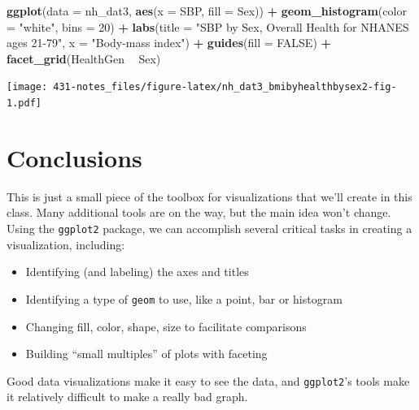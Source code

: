 \documentclass[
]{book}
\newenvironment{Shaded}{\begin{snugshade}}{\end{snugshade}}
\newcommand{\DataTypeTok}[1]{\textcolor[rgb]{0.13,0.29,0.53}{#1}}
\newcommand{\DecValTok}[1]{\textcolor[rgb]{0.00,0.00,0.81}{#1}}
\newcommand{\KeywordTok}[1]{\textcolor[rgb]{0.13,0.29,0.53}{\textbf{#1}}}
\newcommand{\NormalTok}[1]{#1}
\newcommand{\OperatorTok}[1]{\textcolor[rgb]{0.81,0.36,0.00}{\textbf{#1}}}
\newcommand{\OtherTok}[1]{\textcolor[rgb]{0.56,0.35,0.01}{#1}}
\newcommand{\StringTok}[1]{\textcolor[rgb]{0.31,0.60,0.02}{#1}}
\providecommand{\tightlist}{%
  \setlength{\itemsep}{0pt}\setlength{\parskip}{0pt}}
\begin{document}
\begin{Shaded}
\begin{Highlighting}[]
\KeywordTok{ggplot}\NormalTok{(}\DataTypeTok{data =}\NormalTok{ nh_dat3, }\KeywordTok{aes}\NormalTok{(}\DataTypeTok{x =}\NormalTok{ SBP, }\DataTypeTok{fill =}\NormalTok{ Sex)) }\OperatorTok{+}\StringTok{ }
\StringTok{    }\KeywordTok{geom_histogram}\NormalTok{(}\DataTypeTok{color =} \StringTok{"white"}\NormalTok{, }\DataTypeTok{bins =} \DecValTok{20}\NormalTok{) }\OperatorTok{+}\StringTok{ }
\StringTok{    }\KeywordTok{labs}\NormalTok{(}\DataTypeTok{title =} \StringTok{"SBP by Sex, Overall Health for NHANES ages 21-79"}\NormalTok{,}
         \DataTypeTok{x =} \StringTok{"Body-mass index"}\NormalTok{) }\OperatorTok{+}\StringTok{ }
\StringTok{    }\KeywordTok{guides}\NormalTok{(}\DataTypeTok{fill =} \OtherTok{FALSE}\NormalTok{) }\OperatorTok{+}
\StringTok{    }\KeywordTok{facet_grid}\NormalTok{(HealthGen }\OperatorTok{~}\StringTok{ }\NormalTok{Sex)}
\end{Highlighting}
\end{Shaded}

\texttt{[image: 431-notes\_files/figure-latex/nh\_dat3\_bmibyhealthbysex2-fig-1.pdf]}

\hypertarget{conclusions}{%
\section{Conclusions}\label{conclusions}}

This is just a small piece of the toolbox for visualizations that we'll create in this class. Many additional tools are on the way, but the main idea won't change. Using the \texttt{ggplot2} package, we can accomplish several critical tasks in creating a visualization, including:

\begin{itemize}
\tightlist
\item
  Identifying (and labeling) the axes and titles
\item
  Identifying a type of \texttt{geom} to use, like a point, bar or histogram
\item
  Changing fill, color, shape, size to facilitate comparisons
\item
  Building ``small multiples'' of plots with faceting
\end{itemize}

Good data visualizations make it easy to see the data, and \texttt{ggplot2}'s tools make it relatively difficult to make a really bad graph.
\end{document}
